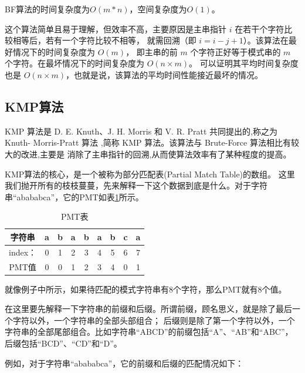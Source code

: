\documentclass[lang=cn,newtx,10pt,scheme=chinese]{../elegantbook}
\begin{document}
BF算法的时间复杂度为$O(m*n)$，空间复杂度为$O(1)$。

这个算法简单且易于理解，但效率不高，主要原因是主串指针 $i$ 在若干个字符比较相等后，若有一个字符比较不相等，
就需回溯（即 $i = i - j + 1$）。该算法在最好情况下的时间复杂度为 $O(m)$，
即主串的前 $m$ 个字符正好等于模式串的 $m$ 个字符。在最坏情况下的时间复杂度为 $O(n \times m)$。
可以证明其平均时间复杂度也是 $O(n \times m)$，也就是说，该算法的平均时间性能接近最坏的情况。
\subsection{KMP算法}

KMP 算法是 D. E. Knuth、J. H. Morris 和 V. R. Pratt 共同提出的,称之为 Knuth-
Morris-Pratt 算法 ,简称 KMP 算法。该算法与 Brute-Force 算法相比有较大的改进,主要是
消除了主串指针的回溯,从而使算法效率有了某种程度的提高。

KMP算法的核心，是一个被称为部分匹配表(Partial Match Table)的数组。
这里我们抛开所有的枝枝蔓蔓，先来解释一下这个数据到底是什么。对于字符串“abababca”，它的PMT如表\ref{table:PMT}所示。


\begin{table}[htbp]
  \centering
  \caption{PMT表}
  \begin{tabular}{|c|c|c|c|c|c|c|c|c|}
    \hline
    字符串 & a & b & a & b & a & b & c & a \\
    \hline
    index： & 0 & 1 & 2 & 3 & 4 & 5 & 6 & 7 \\
    \hline
    PMT值 & 0 & 0 & 1 & 2 & 3 & 4 & 0 & 1 \\
    \hline
  \end{tabular}
  \label{table:PMT}
\end{table}

就像例子中所示，如果待匹配的模式字符串有8个字符，那么PMT就有8个值。

在这里要先解释一下字符串的前缀和后缀。所谓前缀，顾名思义，就是除了最后一个字符以外，一个字符串的全部头部组合；
后缀则是除了第一个字符以外，一个字符串的全部尾部组合。比如字符串“ABCD”的前缀包括“A”、“AB”和“ABC”，后缀包括“BCD”、“CD”和“D”。

例如，对于字符串“abababca”，它的前缀和后缀的匹配情况如下：
\end{document}
